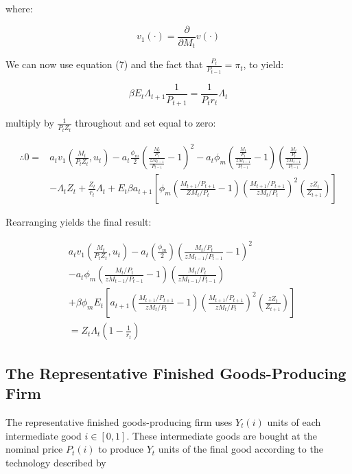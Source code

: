 \documentclass[11pt,preprint, authoryear]{elsarticle}
\numberwithin{equation}{section}
\numberwithin{figure}{section}
\numberwithin{table}{section}
\begin{document}
where:

\[ v_1(\cdot) = \frac{\partial}{\partial M_t} v(\cdot) \]

We can now use equation (7) and the fact that
\(\frac{P_t}{P_{t-1}} = \pi_t\), to yield:

\[ \beta E_t \Lambda_{t+1} \frac{1}{P_{t+1}} = \frac{1}{P_tr_t} \Lambda_t \]

multiply by \(\frac{1} {P_t Z_t}\) throughout and set equal to zero:

\[\begin{aligned} \therefore 0 = & a_tv_1(\frac{M_t}{P_tZ_t}, u_t) - a_t\frac{\phi_m}{2}(\frac{\frac{M_t}{P_t}}{\frac{zM_{t-1}}{P_{t-1}}}-1)^2 -  a_t \phi_m(\frac{\frac{M_t}{P_t}}{\frac{zM_{t-1}}{P_{t-1}}}-1)(\frac{\frac{M_t}{P_{t}}}{\frac{zM_{t-1}}{P_{t-1}}})\\
& - \Lambda_t Z_t + \frac{Z_t}{r_t} \Lambda_t + E_t\beta a_{t+1} \left[\phi_m(\frac{M_{t+1}/P_{t+1}}{ZM_t/P_t}-1) \left(\frac{M_{t+1}/P_{t+1}}{zM_{t}/P_{t}} \right)^2(\frac{zZ_t}{Z_{t+1}}) \right] \end{aligned}\]

Rearranging yields the final result:

\[\begin{aligned}
&a_{t} v_{1}\left(\frac{M_{t}}{P_{t} Z_{t}}, u_{t}\right)-a_{t}\left(\frac{\phi_{m}}{2}\right)\left(\frac{M_{t} / P_{t}}{z M_{t-1} / P_{t-1}}-1\right)^{2} \\
&-a_{t} \phi_{m}\left(\frac{M_{t} / P_{t}}{z M_{t-1} / P_{t-1}}-1\right)\left(\frac{M_{t} / P_{t}}{z M_{t-1} / P_{t-1}}\right) \\
&+\beta \phi_{m} E_{t}\left[a_{t+1}\left(\frac{M_{t+1} / P_{t+1}}{z M_{t} / P_{t}}-1\right)\left(\frac{M_{t+1} / P_{t+1}}{z M_{t} / P_{t}}\right)^{2}\left(\frac{z Z_{t}}{Z_{t+1}}\right)\right] \\
&=Z_{t} \Lambda_{t}\left(1-\frac{1}{r_{t}}\right)
\end{aligned} \tag{8}\]

\hypertarget{the-representative-finished-goods-producing-firm}{%
\subsection{The Representative Finished Goods-Producing
Firm}\label{the-representative-finished-goods-producing-firm}}

The representative finished goods-producing firm uses \(Y_t(i)\) units
of each intermediate good \(i \in [0,1]\). These intermediate goods are
bought at the nominal price \(P_t(i)\) to produce \(Y_t\) units of the
final good according to the technology described by
\end{document}
